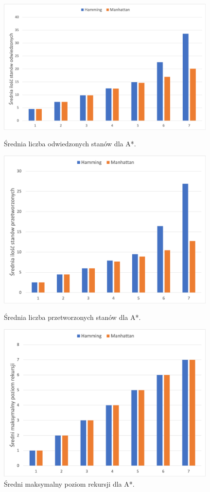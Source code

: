 \documentclass{classrep}
\begin{document}
\begin{figure}		
	\includegraphics[width=11cm]{AStar/AStar_odwiedzone}
	\centering
	\captionsetup{name=Wykres}
	\caption{Średnia liczba odwiedzonych stanów dla A*.}
	
	\includegraphics[width=11cm]{AStar/AStar_przetworzone}
	\centering
	\captionsetup{name=Wykres}
	\caption{Średnia liczba przetworzonych stanów dla A*.}
	
	\includegraphics[width=11cm]{AStar/AStar_poziom_rekursji}
	\centering
	\captionsetup{name=Wykres}
	\caption{Średni maksymalny poziom rekursji dla A*.}
\end{figure}
\end{document}
